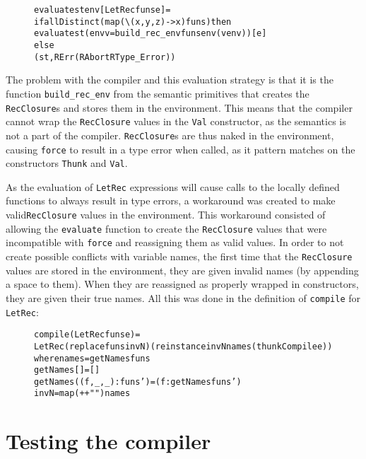 \begin{figure}[H]
\begin{alltt}
  evaluate st env [LetRec funs e] =
    if allDistinct (map (\textbackslash(x,y,z) -> x) funs) then
      evaluate st (env {v = build_rec_env funs env (v env)}) [e]
    else
      (st, RErr (RAbort RType_Error))
\end{alltt}
\end{figure}

\noindent The problem with the compiler and this evaluation strategy is that it
is the function \texttt{build\_rec\_env} from the semantic primitives that
creates the \texttt{RecClosure}s and stores them in the environment. This means
that the compiler cannot wrap the \texttt{RecClosure} values in the
\texttt{Val} constructor, as the semantics is not a part of the compiler.
\texttt{RecClosure}s are thus naked in the environment, causing \texttt{force}
to result in a type error when called, as it pattern matches on the constructors
\texttt{Thunk} and \texttt{Val}.

As the evaluation of \texttt{LetRec} expressions will cause calls to the locally
defined functions to always result in type errors, a workaround was created to
make valid\texttt{RecClosure} values in the environment. This workaround
consisted of allowing the \texttt{evaluate} function to create the
\texttt{RecClosure} values that were incompatible with \texttt{force} and
reassigning them as valid values. In order to not create possible conflicts
with variable names, the first time that the \texttt{RecClosure} values are
stored in the environment, they are given invalid names (by appending a space
to them). When they are reassigned as properly wrapped in constructors, they
are given their true names. All this was done in the definition of
\texttt{compile} for \texttt{LetRec}:

\begin{figure}[H]
\begin{alltt}
compile (LetRec funs e) =
  LetRec (replace funs invN) (reinstance invN names (thunkCompile e))
  where names = getNames funs
        getNames [] = []
        getNames ((f,_,_):funs') = (f:getNames funs')
        invN = map (++ " ") names
\end{alltt}
\end{figure}

\section{Testing the compiler}
